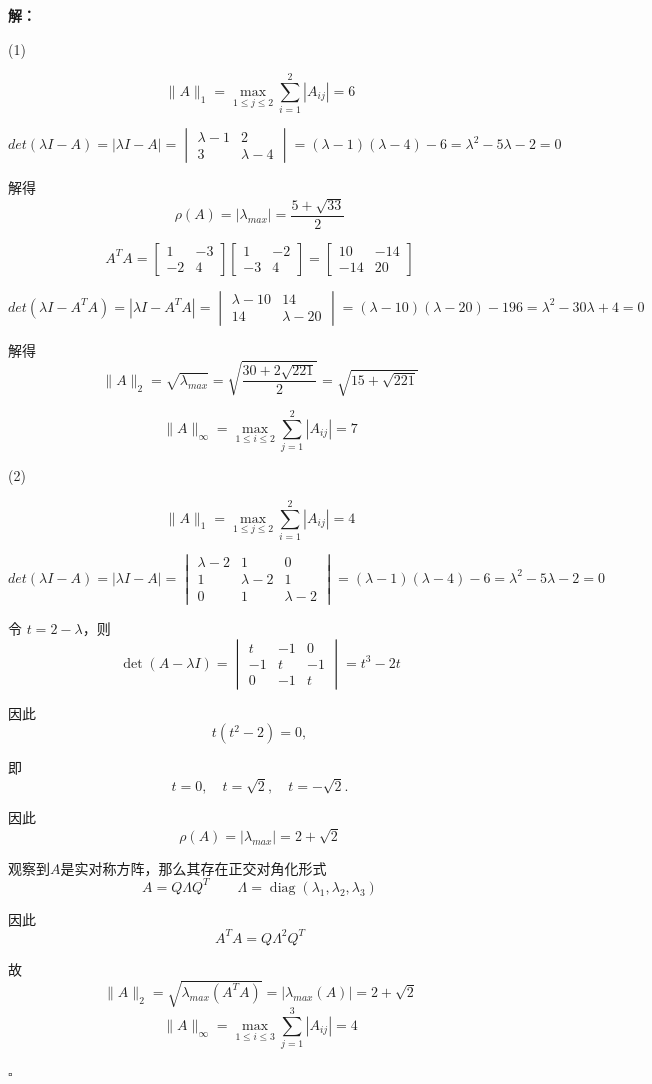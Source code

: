 \documentclass[UTF8,12pt,a4paper]{ctexart}
\newenvironment{solution}
  {\noindent\textbf{解：}\quad}
  {\hfill$\square$\par\medskip}
\begin{document}
\begin{solution}

(1)

\[
\|A\|_1=\max\limits_{1\le j\le 2} \sum_{i=1}^{2}|A_{ij}|=6
\]

\[
det(\lambda I-A) = |\lambda I-A|=\begin{vmatrix}\lambda-1 & 2\\3 & \lambda-4\end{vmatrix}=(\lambda-1)(\lambda-4)-6=\lambda^2-5\lambda-2=0
\]


解得
\[
\rho(A)=|\lambda_{max}|=\frac{5+\sqrt{33}}{2}
\]

\[
A^TA=
\begin{bmatrix}
1 & -3\\
-2 & 4
\end{bmatrix}
\begin{bmatrix}
1 & -2\\
-3 & 4
\end{bmatrix}
=
\begin{bmatrix}
10 & -14\\
-14 & 20
\end{bmatrix}
\]

\[
det(\lambda I-A^TA)=|\lambda I-A^TA|=\begin{vmatrix}\lambda-10 & 14\\14 & \lambda-20\end{vmatrix}=(\lambda-10)(\lambda-20)-196=\lambda^2-30\lambda+4=0
\]

解得
\[
\|A\|_2 = \sqrt{\lambda_{max}}=\sqrt{\frac{30+2\sqrt{221}}{2}}=\sqrt{15+\sqrt{221}}
\]

\[
\|A\|_\infty=\max\limits_{1\le i\le 2} \sum_{j=1}^{2}|A_{ij}|=7
\]


(2)

\[
\|A\|_1=\max\limits_{1\le j\le 2} \sum_{i=1}^{2}|A_{ij}|=4
\]

\[
det(\lambda I-A) = |\lambda I-A|=\begin{vmatrix}\lambda-2 & 1 & 0\\1 & \lambda-2 & 1 \\ 0 & 1 & \lambda-2\end{vmatrix}=(\lambda-1)(\lambda-4)-6=\lambda^2-5\lambda-2=0
\]

令 \(t=2-\lambda\)，则
\[
\det(A-\lambda I)
=
\begin{vmatrix}
t&-1&0\\
-1&t&-1\\
0&-1&t
\end{vmatrix}
=t^3-2t
\]

因此
\[
t(t^2-2)=0,
\]

即
\[
t=0,\quad t=\sqrt2,\quad t=-\sqrt2.
\]

因此
\[
\rho(A)=|\lambda_{max}|=2+\sqrt{2}
\]

观察到\(A\)是实对称方阵，那么其存在正交对角化形式
\[
A=Q\Lambda Q^T\qquad \Lambda=\operatorname{diag}(\lambda_1,\lambda_2,\lambda_3)
\]

因此
\[
A^TA=Q\Lambda^2Q^T
\]

故
\[
\|A\|_2=\sqrt{\lambda_{max}(A^TA)}=|\lambda_{max}(A)|=2+\sqrt{2}
\]
\[
\|A\|_\infty=\max\limits_{1\le i\le 3} \sum_{j=1}^{3}|A_{ij}|=4
\]

\end{solution}
\end{document}
